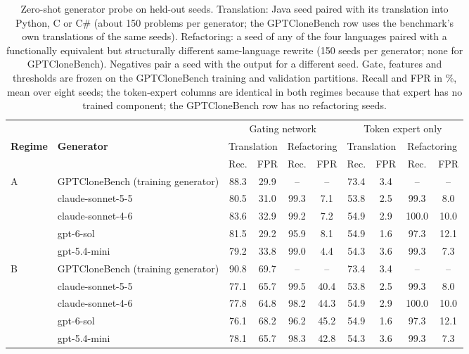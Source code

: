 \begin{table}[t]
\centering
\caption{Zero-shot generator probe on held-out seeds. Translation: Java seed paired with its translation into Python, C or C\# (about 150 problems per generator; the GPTCloneBench row uses the benchmark's own translations of the same seeds). Refactoring: a seed of any of the four languages paired with a functionally equivalent but structurally different same-language rewrite (150 seeds per generator; none for GPTCloneBench). Negatives pair a seed with the output for a different seed. Gate, features and thresholds are frozen on the GPTCloneBench training and validation partitions. Recall and FPR in \%, mean over eight seeds; the token-expert columns are identical in both regimes because that expert has no trained component; the GPTCloneBench row has no refactoring seeds.}
\label{tab:probe}
\scriptsize
\setlength{\tabcolsep}{3.5pt}
\begin{tabular}{ll|cc|cc|cc|cc}
\toprule
 & & \multicolumn{4}{c|}{Gating network} & \multicolumn{4}{c}{Token expert only} \\
\textbf{Regime} & \textbf{Generator} & \multicolumn{2}{c}{Translation} & \multicolumn{2}{c|}{Refactoring} & \multicolumn{2}{c}{Translation} & \multicolumn{2}{c}{Refactoring} \\
 & & Rec. & FPR & Rec. & FPR & Rec. & FPR & Rec. & FPR \\
\midrule
A & GPTCloneBench (training generator) & 88.3 & 29.9 & -- & -- & 73.4 & 3.4 & -- & -- \\
 & claude-sonnet-5-5 & 80.5 & 31.0 & 99.3 & 7.1 & 53.8 & 2.5 & 99.3 & 8.0 \\
 & claude-sonnet-4-6 & 83.6 & 32.9 & 99.2 & 7.2 & 54.9 & 2.9 & 100.0 & 10.0 \\
 & gpt-6-sol & 81.5 & 29.2 & 95.9 & 8.1 & 54.9 & 1.6 & 97.3 & 12.1 \\
 & gpt-5.4-mini & 79.2 & 33.8 & 99.0 & 4.4 & 54.3 & 3.6 & 99.3 & 7.3 \\
\midrule
B & GPTCloneBench (training generator) & 90.8 & 69.7 & -- & -- & 73.4 & 3.4 & -- & -- \\
 & claude-sonnet-5-5 & 77.1 & 65.7 & 99.5 & 40.4 & 53.8 & 2.5 & 99.3 & 8.0 \\
 & claude-sonnet-4-6 & 77.8 & 64.8 & 98.2 & 44.3 & 54.9 & 2.9 & 100.0 & 10.0 \\
 & gpt-6-sol & 76.1 & 68.2 & 96.2 & 45.2 & 54.9 & 1.6 & 97.3 & 12.1 \\
 & gpt-5.4-mini & 78.1 & 65.7 & 98.3 & 42.8 & 54.3 & 3.6 & 99.3 & 7.3 \\
\bottomrule
\end{tabular}
\end{table}